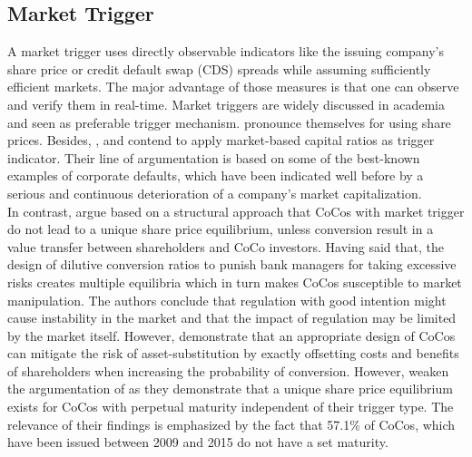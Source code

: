 \subsection{Market Trigger} \label{markettrigger}

A market trigger uses directly observable indicators like the issuing company's share price or credit default swap (CDS) spreads while assuming sufficiently efficient markets. The major advantage of those measures is that one can observe and verify them in real-time. \citep{haldane2011capital} Market triggers are widely discussed in academia and seen as preferable trigger mechanism. \citet{calomiris2013design} pronounce themselves for using share prices. Besides, \citet{haldane2011capital}, \citet{pazarbasioglu2011contingent} and \citep{calomiris2013design} contend to apply market-based capital ratios as trigger indicator. Their line of argumentation is based on some of the best-known examples of corporate defaults, which have been indicated well before by a serious and continuous deterioration of a company's market capitalization.\\ 

In contrast, \citet{sundaresan2015design} argue based on a structural approach that CoCos with market trigger do not lead to a unique share price equilibrium, unless conversion result in a value transfer  between shareholders and CoCo investors. Having said that, the design of dilutive conversion ratios to punish bank managers for taking excessive risks creates multiple equilibria which in turn makes CoCos susceptible to market manipulation. The authors conclude that regulation with good intention might cause instability in the market and that the impact of regulation may be limited by the market itself. However, \citet{hilscher2014bank} demonstrate that an appropriate design of CoCos can mitigate the risk of asset-substitution by exactly offsetting costs and benefits of shareholders when increasing the probability of conversion. However, \citet{pennacchi2015reexamination} weaken the argumentation of \citet{sundaresan2015design} as they demonstrate that a unique share price equilibrium exists for CoCos with perpetual maturity independent of their trigger type. The relevance of their findings is emphasized by the fact that 57.1\% of CoCos, which have been issued between 2009 and 2015 do not have a set maturity. \citep{europeanparliament2016}



